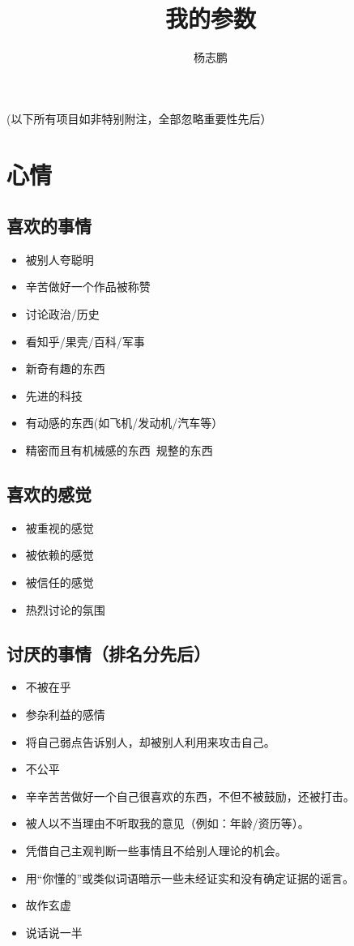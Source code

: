 \documentclass[UTF8]{ctexart}
\title{我的参数}
\author{杨志鹏}
\begin{document}
\maketitle
\pagestyle{fancy}
\tableofcontents{}
\newpage
\paragraph{}
\begin{center}
(以下所有项目如非特别附注，全部忽略重要性先后）
\end{center}
\section{心情}
\subsection{喜欢的事情}
\begin{itemize}
\item 被别人夸聪明
\item 辛苦做好一个作品被称赞
\item 讨论政治/历史
\item 看知乎/果壳/百科/军事
\item 新奇有趣的东西
\item 先进的科技
\item 有动感的东西(如飞机/发动机/汽车等）
\item 精密而且有机械感的东西\ 规整的东西
\end{itemize}
\subsection{喜欢的感觉}
\begin{itemize}
\item 被重视的感觉
\item 被依赖的感觉
\item 被信任的感觉
\item 热烈讨论的氛围
\end{itemize}
\subsection{讨厌的事情（排名分先后）}
\begin{itemize}
\item 不被在乎
\item 参杂利益的感情
\item 将自己弱点告诉别人，却被别人利用来攻击自己。
\item 不公平
\item 辛辛苦苦做好一个自己很喜欢的东西，不但不被鼓励，还被打击。
\item 被人以不当理由不听取我的意见（例如：年龄/资历等）。
\item 凭借自己主观判断一些事情且不给别人理论的机会。
\item 用“你懂的”或类似词语暗示一些未经证实和没有确定证据的谣言。
\item 故作玄虚
\item 说话说一半
\end{itemize}
\end{document}
